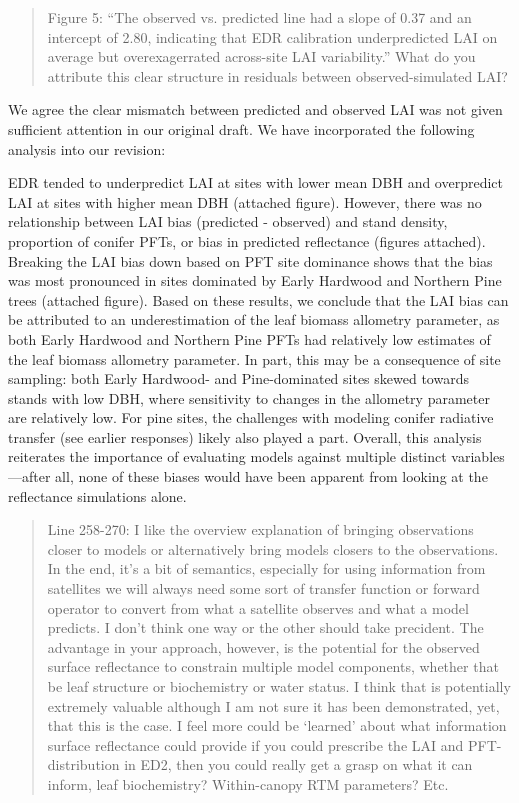 \begin{quote}
  Figure 5: “The observed vs. predicted line had a slope of 0.37 and an intercept of 2.80, indicating that EDR calibration underpredicted LAI on average but overexagerrated across-site LAI variability.” What do you attribute this clear structure in residuals between observed-simulated LAI?
\end{quote}

We agree the clear mismatch between predicted and observed LAI was not given sufficient attention in our original draft. We have incorporated the following analysis into our revision:

EDR tended to underpredict LAI at sites with lower mean DBH and overpredict LAI at sites with higher mean DBH (attached figure). However, there was no relationship between LAI bias (predicted - observed) and stand density, proportion of conifer PFTs, or bias in predicted reflectance (figures attached). Breaking the LAI bias down based on PFT site dominance shows that the bias was most pronounced in sites dominated by Early Hardwood and Northern Pine trees (attached figure). Based on these results, we conclude that the LAI bias can be attributed to an underestimation of the leaf biomass allometry parameter, as both Early Hardwood and Northern Pine PFTs had relatively low estimates of the leaf biomass allometry parameter. In part, this may be a consequence of site sampling: both Early Hardwood- and Pine-dominated sites skewed towards stands with low DBH, where sensitivity to changes in the allometry parameter are relatively low. For pine sites, the challenges with modeling conifer radiative transfer (see earlier responses) likely also played a part. Overall, this analysis reiterates the importance of evaluating models against multiple distinct variables---after all, none of these biases would have been apparent from looking at the reflectance simulations alone.

\begin{quote}
  Line 258-270: I like the overview explanation of bringing observations closer to models or alternatively bring models closers to the observations. In the end, it’s a bit of semantics, especially for using information from satellites we will always need some sort of transfer function or forward operator to convert from what a satellite observes and what a model predicts. I don’t think one way or the other should take precident. The advantage in your approach, however, is the potential for the observed surface reflectance to constrain multiple model components, whether that be leaf structure or biochemistry or water status. I think that is potentially extremely valuable although I am not sure it has been demonstrated, yet, that this is the case. I feel more could be ‘learned’ about what information surface reflectance could provide if you could prescribe the LAI and PFT-distribution in ED2, then you could really get a grasp on what it can inform, leaf biochemistry? Within-canopy RTM parameters? Etc.
\end{quote}

